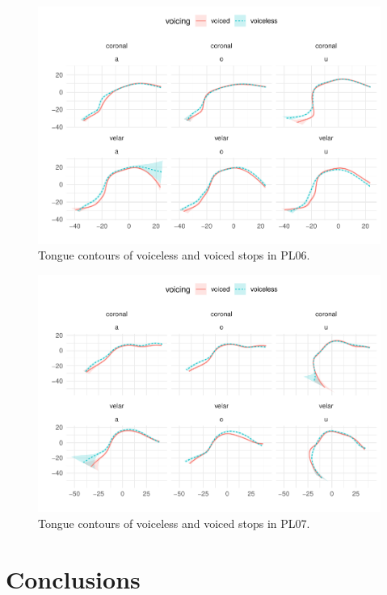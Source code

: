 \documentclass[11pt,]{article}
\begin{document}
\begin{figure}

{\centering \includegraphics[width=.8\textwidth]{2018-polar-gam_files/figure-latex/Figure16} 

}

\caption{Tongue contours of voiceless and voiced stops in PL06.}\label{f:Figure16}
\end{figure}

\begin{figure}

{\centering \includegraphics[width=.8\textwidth]{2018-polar-gam_files/figure-latex/Figure17} 

}

\caption{Tongue contours of voiceless and voiced stops in PL07.}\label{f:Figure17}
\end{figure}

\hypertarget{conclusions}{%
\section{Conclusions}\label{conclusions}}
\end{document}
